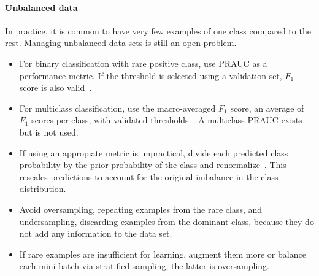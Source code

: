 \paragraph{Unbalanced data}
In practice, it is common to have very few examples of one class compared to the rest. Managing unbalanced data sets is still an open problem.%
\begin{itemize}
	\item For binary classification with rare positive class, use PRAUC as a performance metric. If the threshold is selected using a validation set, $F_1$ score is also valid~\cite{Davis2006}.

	\item For multiclass classification, use the macro-averaged $F_1$ score, an average of $F_1$ scores per class, with validated thresholds~\cite{Ozgur2005}. A multiclass PRAUC exists but is not used.

	\item If using an appropiate metric is impractical, divide each predicted class probability by the prior probability of the class and renormalize~\cite{Bishop1995}. This rescales predictions to account for the original imbalance in the class distribution.

	\item Avoid oversampling, repeating examples from the rare class, and undersampling, discarding examples from the dominant class, because they do not add any information to the data set.

	\item If rare examples are insufficient for learning, augment them more or balance each mini-batch via stratified sampling; the latter is oversampling.

\end{itemize}

